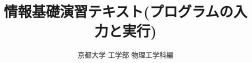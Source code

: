 \documentclass[a4j]{jsbook}
\begin{document}
\title{情報基礎演習テキスト(プログラムの入力と実行)}
\author{京都大学 工学部 物理工学科編}
\date{}
\maketitle

\mainmatter
%



%




%
%
\backmatter

\end{document}
